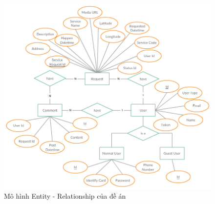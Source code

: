 \documentclass[a4paper]{article}
\begin{document}
\begin{center}
    \begin{figure}[h]
    \begin{center}
     \includegraphics[scale=.65]{entity-diagram.png}
    \end{center}
    \caption{Mô hình Entity - Relationship của đề án}
    \label{refhinh1}
    \end{figure}
\end{center}
\end{document}
